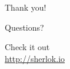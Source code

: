 \documentclass[10pt, compress, xcolor={usenames,dvipsnames}]{beamer}
\renewcommand{\emph}[1]{\alert{#1}}
\begin{document}

\begin{frame}{Thank you!}
  \begin{center}
    \Huge Questions?
  \end{center}
  \vspace{2em}
  \begin{center}
    \emph{Check it out}\vspace{.5em}\\
    \url{http://sherlok.io}\\
  \end{center}
\end{frame}
\end{document}
